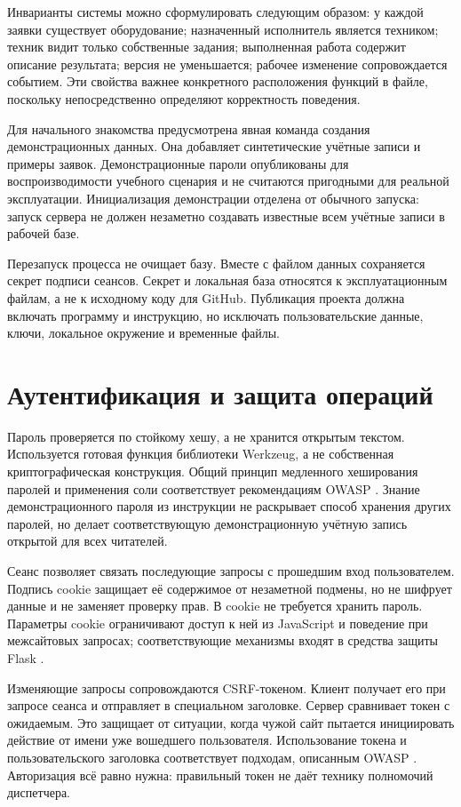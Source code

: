 \documentclass{timcw}
\begin{document}
Инварианты системы можно сформулировать следующим образом: у каждой заявки существует оборудование; назначенный исполнитель является техником; техник видит только собственные задания; выполненная работа содержит описание результата; версия не уменьшается; рабочее изменение сопровождается событием. Эти свойства важнее конкретного расположения функций в файле, поскольку непосредственно определяют корректность поведения.

Для начального знакомства предусмотрена явная команда создания демонстрационных данных. Она добавляет синтетические учётные записи и примеры заявок. Демонстрационные пароли опубликованы для воспроизводимости учебного сценария и не считаются пригодными для реальной эксплуатации. Инициализация демонстрации отделена от обычного запуска: запуск сервера не должен незаметно создавать известные всем учётные записи в рабочей базе.

Перезапуск процесса не очищает базу. Вместе с файлом данных сохраняется секрет подписи сеансов. Секрет и локальная база относятся к эксплуатационным файлам, а не к исходному коду для GitHub. Публикация проекта должна включать программу и инструкцию, но исключать пользовательские данные, ключи, локальное окружение и временные файлы.

\section{Аутентификация и защита операций}

Пароль проверяется по стойкому хешу, а не хранится открытым текстом. Используется готовая функция библиотеки Werkzeug, а не собственная криптографическая конструкция. Общий принцип медленного хеширования паролей и применения соли соответствует рекомендациям OWASP \cite{src11}. Знание демонстрационного пароля из инструкции не раскрывает способ хранения других паролей, но делает соответствующую демонстрационную учётную запись открытой для всех читателей.

Сеанс позволяет связать последующие запросы с прошедшим вход пользователем. Подпись cookie защищает её содержимое от незаметной подмены, но не шифрует данные и не заменяет проверку прав. В cookie не требуется хранить пароль. Параметры cookie ограничивают доступ к ней из JavaScript и поведение при межсайтовых запросах; соответствующие механизмы входят в средства защиты Flask \cite{src12}.

Изменяющие запросы сопровождаются CSRF-токеном. Клиент получает его при запросе сеанса и отправляет в специальном заголовке. Сервер сравнивает токен с ожидаемым. Это защищает от ситуации, когда чужой сайт пытается инициировать действие от имени уже вошедшего пользователя. Использование токена и пользовательского заголовка соответствует подходам, описанным OWASP \cite{src10}. Авторизация всё равно нужна: правильный токен не даёт технику полномочий диспетчера.
\end{document}
